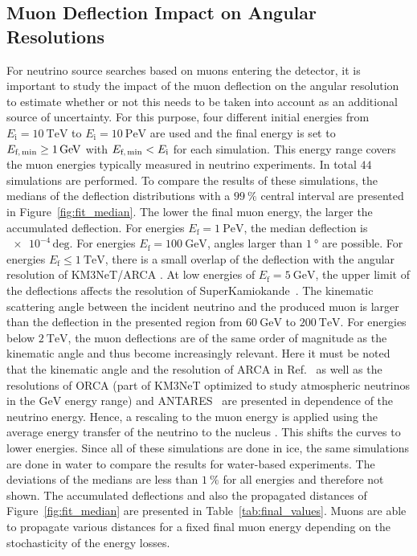 \subsection{Muon Deflection Impact on Angular Resolutions}
For neutrino source searches based on muons entering the detector, 
it is important to study the impact of the muon 
deflection on the angular resolution to estimate whether or not this needs to be 
taken into account as an additional source of uncertainty.
For this purpose, four different initial energies 
from $E_{\text{i}} = \SI{10}{\tera\electronvolt}$ to 
$E_{\text{i}} = \SI{10}{\peta\electronvolt}$ are used and the final 
energy is set to $E_{\text{f,\,min}} \geq \SI{1}{\giga\electronvolt}$ with 
$E_{\text{f,\,min}} < E_{\text{i}}$ for each simulation. 
This energy range covers the muon energies typically measured in 
neutrino experiments.
In total $\num{44}$ simulations are performed. 
To compare the results of these simulations, the medians of the deflection distributions 
with a $\SI{99}{\percent}$ central interval are presented in 
Figure~\ref{fig:fit_median}.
The lower the final muon energy, the larger the accumulated deflection. 
For energies $E_{\text{f}} = \SI{1}{\peta\electronvolt}$, the median deflection 
is $\num{e-4}\,\text{deg}$. For energies $E_{\text{f}} = \SI{100}{\giga\electronvolt}$, 
angles larger than $\SI{1}{\degree}$ are possible. 
For energies  
$E_{\text{f}} \leq \SI{1}{\tera\electronvolt}$, 
there is a small overlap of the deflection with the angular resolution of KM3NeT/ARCA 
\cite{KM3NeT_Resolution2021, KM3NeT_Resolution2016}. 
At low energies of $E_{\mathrm{f}} = \SI{5}{\giga\electronvolt}$, the upper limit of the 
deflections affects the resolution of SuperKamiokande~\cite{SuperKamiokande_Resolution2008}. 
The kinematic scattering angle between the incident neutrino and the produced muon is 
larger than the deflection in the presented region from $\SI{60}{\giga\electronvolt}$
to $\SI{200}{\tera\electronvolt}$. For energies below $\SI{2}{\tera\electronvolt}$,  
the muon deflections are of the same order of magnitude as the kinematic angle and thus become increasingly relevant.
Here it must be noted that the kinematic angle 
and the resolution of ARCA in Ref.~\cite{KM3NeT_Resolution2021} as well as 
the resolutions of ORCA (part of KM3NeT optimized to study atmospheric neutrinos in the $\si{\giga\electronvolt}$ energy range) \cite{ORCA_Resolution2021} and ANTARES~\cite{ANTARES_Resolution2019} are presented in dependence of the neutrino energy. 
Hence, a rescaling to the muon energy is applied using the average energy transfer of the neutrino to 
the nucleus \cite{GANDHI199681}. This shifts the curves to lower energies. 
Since all of these simulations are done 
in ice, the same simulations are done in water to compare the results for 
water-based experiments. The deviations of the medians
are less than $\SI{1}{\percent}$ for all energies and therefore not shown.
The accumulated deflections and also the propagated distances 
of Figure~\ref{fig:fit_median} are presented in Table~\ref{tab:final_values}.
Muons are able to propagate various distances for a fixed final muon energy
depending on the stochasticity of the energy losses.

